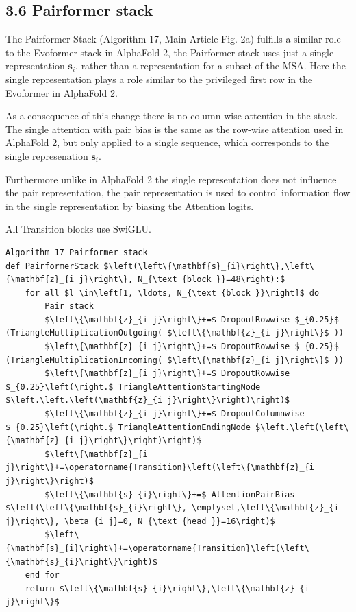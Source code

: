 \documentclass[10pt]{article}
\begin{document}
\subsection*{3.6 Pairformer stack}
The Pairformer Stack (Algorithm 17, Main Article Fig. 2a) fulfills a similar role to the Evoformer stack in AlphaFold 2, the Pairformer stack uses just a single representation $\mathbf{s}_{i}$, rather than a representation for a subset of the MSA. Here the single representation plays a role similar to the privileged first row in the Evoformer in AlphaFold 2.

As a consequence of this change there is no column-wise attention in the stack. The single attention with pair bias is the same as the row-wise attention used in AlphaFold 2, but only applied to a single sequence, which corresponds to the single represenation $\mathbf{s}_{i}$.

Furthermore unlike in AlphaFold 2 the single representation does not influence the pair representation, the pair representation is used to control information flow in the single representation by biasing the Attention logits.

All Transition blocks use SwiGLU.

\begin{verbatim}
Algorithm 17 Pairformer stack
def PairformerStack $\left(\left\{\mathbf{s}_{i}\right\},\left\{\mathbf{z}_{i j}\right\}, N_{\text {block }}=48\right):$
    for all $l \in\left[1, \ldots, N_{\text {block }}\right]$ do
        Pair stack
        $\left\{\mathbf{z}_{i j}\right\}+=$ DropoutRowwise $_{0.25}$ (TriangleMultiplicationOutgoing( $\left\{\mathbf{z}_{i j}\right\}$ ))
        $\left\{\mathbf{z}_{i j}\right\}+=$ DropoutRowwise $_{0.25}$ (TriangleMultiplicationIncoming( $\left\{\mathbf{z}_{i j}\right\}$ ))
        $\left\{\mathbf{z}_{i j}\right\}+=$ DropoutRowwise $_{0.25}\left(\right.$ TriangleAttentionStartingNode $\left.\left.\left(\mathbf{z}_{i j}\right\}\right)\right)$
        $\left\{\mathbf{z}_{i j}\right\}+=$ DropoutColumnwise $_{0.25}\left(\right.$ TriangleAttentionEndingNode $\left.\left(\left\{\mathbf{z}_{i j}\right\}\right)\right)$
        $\left\{\mathbf{z}_{i j}\right\}+=\operatorname{Transition}\left(\left\{\mathbf{z}_{i j}\right\}\right)$
        $\left\{\mathbf{s}_{i}\right\}+=$ AttentionPairBias $\left(\left\{\mathbf{s}_{i}\right\}, \emptyset,\left\{\mathbf{z}_{i j}\right\}, \beta_{i j}=0, N_{\text {head }}=16\right)$
        $\left\{\mathbf{s}_{i}\right\}+=\operatorname{Transition}\left(\left\{\mathbf{s}_{i}\right\}\right)$
    end for
    return $\left\{\mathbf{s}_{i}\right\},\left\{\mathbf{z}_{i j}\right\}$
\end{verbatim}
\end{document}
